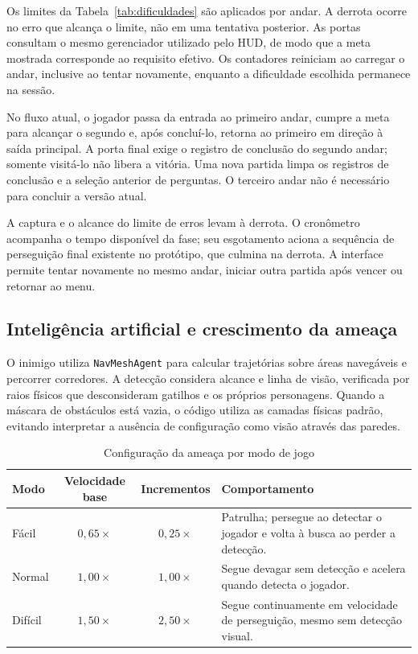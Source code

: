 \documentclass[12pt]{article}
\begin{document}
Os limites da Tabela~\ref{tab:dificuldades} são aplicados por andar. A derrota ocorre no erro que alcança o limite, não em uma tentativa posterior. As portas consultam o mesmo gerenciador utilizado pelo HUD, de modo que a meta mostrada corresponde ao requisito efetivo. Os contadores reiniciam ao carregar o andar, inclusive ao tentar novamente, enquanto a dificuldade escolhida permanece na sessão.

No fluxo atual, o jogador passa da entrada ao primeiro andar, cumpre a meta para alcançar o segundo e, após concluí-lo, retorna ao primeiro em direção à saída principal. A porta final exige o registro de conclusão do segundo andar; somente visitá-lo não libera a vitória. Uma nova partida limpa os registros de conclusão e a seleção anterior de perguntas. O terceiro andar não é necessário para concluir a versão atual.

A captura e o alcance do limite de erros levam à derrota. O cronômetro acompanha o tempo disponível da fase; seu esgotamento aciona a sequência de perseguição final existente no protótipo, que culmina na derrota. A interface permite tentar novamente no mesmo andar, iniciar outra partida após vencer ou retornar ao menu.

\subsection{Inteligência artificial e crescimento da ameaça}

O inimigo utiliza \texttt{NavMeshAgent} para calcular trajetórias sobre áreas navegáveis e percorrer corredores. A detecção considera alcance e linha de visão, verificada por raios físicos que desconsideram gatilhos e os próprios personagens. Quando a máscara de obstáculos está vazia, o código utiliza as camadas físicas padrão, evitando interpretar a ausência de configuração como visão através das paredes.

\begin{table}[H]
\centering
\caption{Configuração da ameaça por modo de jogo}
\label{tab:inimigo-modos}
\small
\begin{tabularx}{\textwidth}{l c c X}
\toprule
\textbf{Modo} & \textbf{Velocidade base} & \textbf{Incrementos} & \textbf{Comportamento} \\
\midrule
Fácil & $0{,}65\times$ & $0{,}25\times$ & Patrulha; persegue ao detectar o jogador e volta à busca ao perder a detecção. \\
Normal & $1{,}00\times$ & $1{,}00\times$ & Segue devagar sem detecção e acelera quando detecta o jogador. \\
Difícil & $1{,}50\times$ & $2{,}50\times$ & Segue continuamente em velocidade de perseguição, mesmo sem detecção visual. \\
\bottomrule
\end{tabularx}
\end{table}
\end{document}
